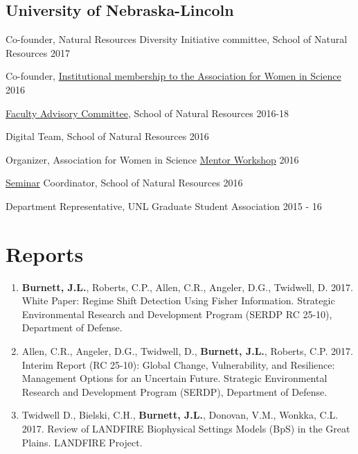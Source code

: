 \documentclass[11pt,]{article}
\providecommand{\tightlist}{%
  \setlength{\itemsep}{0pt}\setlength{\parskip}{0pt}}
\renewenvironment{itemize}{
 \begin{list}{- }{
   \setlength{\leftmargin}{1.5em}
   \setlength{\itemsep}{0pt}
 }
}{
 \end{list}
}
\begin{document}
\hypertarget{university-of-nebraska-lincoln}{%
\subsection{University of
Nebraska-Lincoln}\label{university-of-nebraska-lincoln}}

\begin{itemize}
\tightlist
\item
  Co-founder, Natural Resources Diversity Initiative committee, School
  of Natural Resources \hfill 2017
\item
  Co-founder,
  \href{http://news.unl.edu/newsrooms/today/article/university-is-institutional-partner-with-association-for-women-in-science/}{Institutional
  membership to the Association for Women in Science} \hfill 2016
\item
  \href{http://snr.unl.edu/employeeinfo/people/committee/facultyadvisory.asp}{Faculty
  Advisory Committee}, School of Natural Resources \hfill 2016-18
\item
  Digital Team, School of Natural Resources \hfill 2016
\item
  Organizer, Association for Women in Science
  \href{http://snr.unl.edu/registration/AWISMentor/MentorMenteeRegistrationAttendanceCap.aspx?utm_source=Google\&utm_medium=email\&utm_term=\&utm_content=\&utm_campaign=AWIS+Workshop}{Mentor
  Workshop} \hfill 2016
\item
  \href{http://unlcms.unl.edu/snr/gsa/snr-gsa-seminar-coordinators}{Seminar}
  Coordinator, School of Natural Resources \hfill 2016
\item
  Department Representative, UNL Graduate Student Association
  \hfill 2015 - 16
\end{itemize}

\hypertarget{reports}{%
\section{Reports}\label{reports}}

\begin{enumerate}
\def\labelenumi{\arabic{enumi}.}
\tightlist
\item
  \textbf{Burnett, J.L.}, Roberts, C.P., Allen, C.R., Angeler, D.G.,
  Twidwell, D. 2017. White Paper: Regime Shift Detection Using Fisher
  Information. Strategic Environmental Research and Development Program
  (SERDP RC 25-10), Department of Defense.\\
\item
  Allen, C.R., Angeler, D.G., Twidwell, D., \textbf{Burnett, J.L.},
  Roberts, C.P. 2017. Interim Report (RC 25-10): Global Change,
  Vulnerability, and Resilience: Management Options for an Uncertain
  Future. Strategic Environmental Research and Development Program
  (SERDP), Department of Defense.\\
\item
  Twidwell D., Bielski, C.H., \textbf{Burnett, J.L.}, Donovan, V.M.,
  Wonkka, C.L. 2017. Review of LANDFIRE Biophysical Settings Models
  (BpS) in the Great Plains. LANDFIRE Project.
\end{enumerate}
\end{document}
